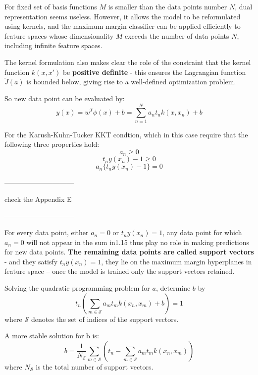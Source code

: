 \documentclass[twoside]{article}
\begin{document}
For fixed set of basis functions $M$ is smaller than the data points number $N$, dual representation seems useless.
However, it allows the model to be reformulated using kernels, and the maximum margin classifier can be applied efficiently to feature spaces whose dimensionality $M$ exceeds the number of data points $N$, including infinite feature spaces.

The kernel formulation also makes clear the role of the constraint that the kernel function $k(x, x')$ be \textbf{positive definite} - this ensures the Lagrangian function $\tilde{J}(a)$ is bounded below, giving rise to a well-defined optimization problem.

So new data point can be evaluated by:
\begin{equation}
y(x) = w^T\phi(x)+b = \sum_{n=1}^{N} a_n t_n k(x, x_n)+b
\end{equation}

For the Karush-Kuhn-Tucker KKT condtion, which in this case require that the following three properties hold:
\begin{equation}
a_n\geq0
\end{equation}
\begin{equation}
t_ny(x_n) - 1 \geq 0
\end{equation}
\begin{equation}
a_n\{t_n y(x_n)-1\} = 0
\end{equation}

------------------------------

check the Appendix E

------------------------------

For every data point, either $a_n=0$ or $t_ny(x_n)=1$, any data point for which $a_n=0$ will not appear in the sum in1.15 thus play no role in making predictions for new data points. \textbf{The remaining data points are called support vectors} - and they satisfy $t_ny(x_n)=1$, they lie on the maximum margin hyperplanes in feature space -- once the model is trained only the support vectors retained.

Solving the quadratic programming problem for $a$, determine $b$ by 
\begin{equation}
t_n(\sum_{m\in \mathcal{S}} a_mt_mk(x_n, x_m)+b)=1
\end{equation} where $\mathcal{S}$ denotes the set of indices of the support vectors.

A more stable solution for b is:
\begin{equation}
b=\frac{1}{N_{\mathcal{S}}} \sum_{m\in \mathcal{S}} (t_n - \sum_{m\in \mathcal{S}} a_mt_mk(x_n, x_m) )
\end{equation}
where $N_{\mathcal{S}}$ is the total number of support vectors.
\end{document}
